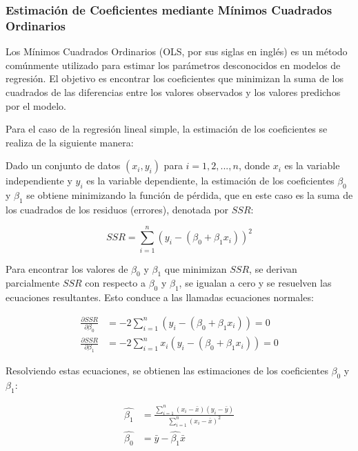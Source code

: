 \documentclass[
]{article}
\begin{document}
\hypertarget{estimaciuxf3n-de-coeficientes-mediante-muxednimos-cuadrados-ordinarios}{%
\subsubsection{Estimación de Coeficientes mediante Mínimos Cuadrados
Ordinarios}\label{estimaciuxf3n-de-coeficientes-mediante-muxednimos-cuadrados-ordinarios}}

Los Mínimos Cuadrados Ordinarios (OLS, por sus siglas en inglés) es un
método comúnmente utilizado para estimar los parámetros desconocidos en
modelos de regresión. El objetivo es encontrar los coeficientes que
minimizan la suma de los cuadrados de las diferencias entre los valores
observados y los valores predichos por el modelo.

Para el caso de la regresión lineal simple, la estimación de los
coeficientes se realiza de la siguiente manera:

Dado un conjunto de datos \({(x_i, y_i)}\) para \(i = 1, 2, ..., n\),
donde \(x_i\) es la variable independiente y \(y_i\) es la variable
dependiente, la estimación de los coeficientes \(\beta_0\) y \(\beta_1\)
se obtiene minimizando la función de pérdida, que en este caso es la
suma de los cuadrados de los residuos (errores), denotada por \(SSR\):

\begin{equation}
SSR = \sum_{i=1}^{n} (y_i - (\beta_0 + \beta_1 x_i))^2
\end{equation}

Para encontrar los valores de \(\beta_0\) y \(\beta_1\) que minimizan
\(SSR\), se derivan parcialmente \(SSR\) con respecto a \(\beta_0\) y
\(\beta_1\), se igualan a cero y se resuelven las ecuaciones
resultantes. Esto conduce a las llamadas ecuaciones normales:

\begin{align}
\frac{\partial SSR}{\partial \beta_0} &= -2 \sum_{i=1}^{n} (y_i - (\beta_0 + \beta_1 x_i)) = 0 \\
\frac{\partial SSR}{\partial \beta_1} &= -2 \sum_{i=1}^{n} x_i(y_i - (\beta_0 + \beta_1 x_i)) = 0
\end{align}

Resolviendo estas ecuaciones, se obtienen las estimaciones de los
coeficientes \(\beta_0\) y \(\beta_1\):

\begin{align}
\hat{\beta_1} &= \frac{\sum_{i=1}^{n} (x_i - \bar{x})(y_i - \bar{y})}{\sum_{i=1}^{n} (x_i - \bar{x})^2} \\
\hat{\beta_0} &= \bar{y} - \hat{\beta_1}\bar{x}
\end{align}
\end{document}
